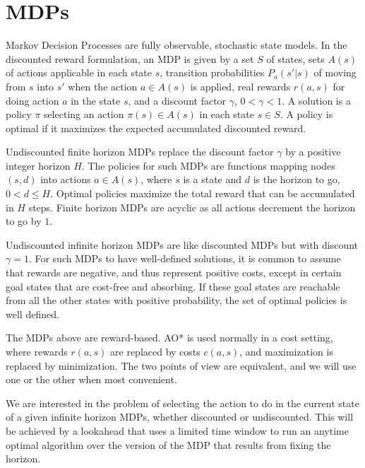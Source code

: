 \documentclass[letterpaper]{article}
\newcommand{\Omit}[1]{}
\begin{document}
\Omit{
The paper is organized as follows. We review MDPs, AO* and UCT, and then introduce Anytime AO* and
compare it with UCT. }

\section{MDPs}

Markov Decision Processes are fully observable, stochastic state models.
In the discounted reward formulation, an MDP is given by a set $S$ of states,
sets $A(s)$  of actions applicable in each state $s$, transition probabilities
$P_a(s'|s)$ of moving from $s$ into $s'$ when the action $a \in A(s)$ is applied,
real rewards  $r(a,s)$ for  doing action $a$ in the state $s$, and a discount
factor $\gamma$, $0 < \gamma < 1$. A solution  is a policy $\pi$
selecting an action $\pi(s) \in A(s)$ in each state $s \in S$. A policy is
optimal if it maximizes the expected accumulated discounted reward.

Undiscounted finite horizon MDPs replace the discount factor $\gamma$
by a positive integer horizon $H$. The policies for such MDPs are
functions  mapping nodes $(s,d)$ into actions $a \in A(s)$, where $s$
is a state and $d$ is the horizon to go, $0 <  d \leq H$. Optimal
policies maximize the total reward that can be accumulated in $H$
steps. Finite horizon MDPs are acyclic as all actions decrement the
horizon to go by $1$.

Undiscounted infinite horizon MDPs are like discounted MDPs but
with discount $\gamma=1$. For such MDPs to have well-defined
solutions, it is common to assume that rewards are negative, and
thus represent positive costs, except in certain goal states
that are cost-free and absorbing. If these goal states
are reachable from all the other  states  with positive
probability, the set of optimal policies is well defined.

The MDPs above are reward-based. AO* is used normally in a cost
setting, where rewards $r(a,s)$ are replaced by costs $c(a,s)$,
and maximization is replaced by minimization. The two points of
view are equivalent, and we will use one or the other
when most convenient.

We  are interested in the problem of selecting the
action to do in the current state of a given infinite horizon MDPs, whether
discounted or undiscounted. This will be achieved by a lookahead that
uses a limited time window to run an anytime optimal algorithm over the version
of the MDP that results from fixing the horizon.
\end{document}
